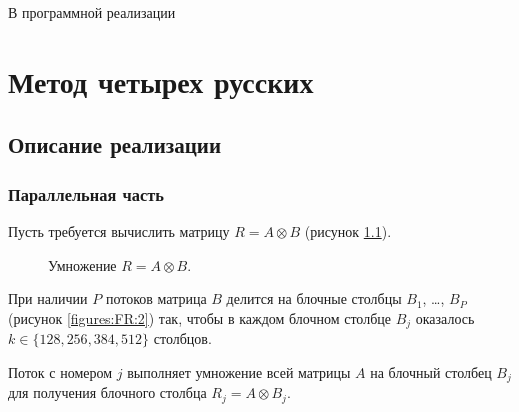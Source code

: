\documentclass[a4paper,12pt]{report}
\begin{document}
В программной реализации 

\chapter{Метод четырех русских}

\section{Описание реализации}

\subsection{Параллельная часть}

Пусть требуется вычислить матрицу $R = A \otimes B$ (рисунок \ref{figures:FR:1}).

\begin{figure}
	\caption{Умножение $R = A \otimes B$.}
	\label{figures:FR:1}
\end{figure}

При наличии $P$ потоков матрица $B$ делится на блочные столбцы $B_1$, \ldots, $B_P$ (рисунок \ref{figures:FR:2}) так, чтобы в каждом блочном столбце $B_j$ оказалось
$k \in \{128, 256, 384, 512\}$ столбцов.

Поток с номером $j$ выполняет умножение всей матрицы $A$ на блочный столбец $B_j$ для получения блочного столбца $R_j = A \otimes B_j$.
\end{document}
